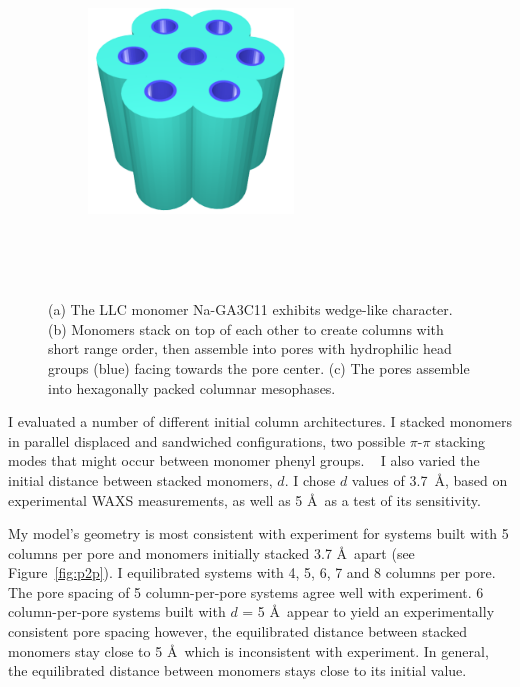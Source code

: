 \documentclass{article}
\begin{document}
\begin{figure}[!htb]
\begin{subfigure}{0.325\linewidth}
              \centering
              \includegraphics[width=0.6\textwidth]{hexagonal_packing.pdf}
              \caption{}~\label{fig:hex_packing_simple}
      \end{subfigure}
      \caption{(a) The LLC monomer Na-GA3C11 exhibits wedge-like character. (b) 
      Monomers stack on top of each other to create columns with short range order,
      then assemble into pores with hydrophilic head groups (blue) facing towards 
      the pore center. (c) The pores assemble into hexagonally packed columnar
      mesophases.}~\label{fig:assembly}
      \vspace{-0.5cm}
  \end{figure}
  
  I evaluated a number of different initial column architectures. I stacked 
  monomers in parallel displaced and sandwiched configurations, two possible
  $\pi$-$\pi$ stacking modes that might occur between monomer phenyl groups.
  ~\cite{sinnokrot_estimates_2002} I also varied the initial distance between
  stacked monomers, $d$. I chose $d$ values of 3.7~\AA, based on experimental
  WAXS measurements, as well as 5 \AA~as a test of its sensitivity.
  
  My model's geometry is most consistent with experiment for systems built
  with 5 columns per pore and monomers initially stacked 3.7 \AA~apart
  (see Figure~\ref{fig:p2p}). I equilibrated systems with 4, 5, 6, 7 and 
  8 columns per pore. The pore spacing of 5 column-per-pore systems agree
  well with experiment. 6 column-per-pore systems built with $d$ = 5 \AA~appear
  to yield an experimentally consistent pore spacing however, the equilibrated
  distance between stacked monomers stay close to 5 \AA~which is inconsistent
  with experiment. In general, the equilibrated distance between monomers stays
  close to its initial value. 
  
\end{document}
